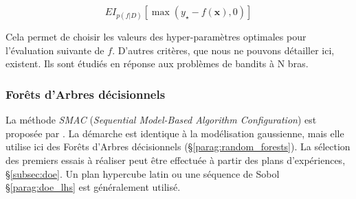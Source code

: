 \begin{equation} \label{eq:ei}
{EI}_{p(f | D)}\left[\max \left(y_{\star}-f(\boldsymbol{x}), 0\right)\right]
\end{equation}

Cela permet de choisir les valeurs des hyper-paramètres optimales pour l'évaluation suivante de $f$.
D'autres critères, que nous ne pouvons détailler ici, existent.
Ils sont étudiés en réponse aux problèmes de bandits à N bras.


\subsubsection{Forêts d'Arbres décisionnels} \label{subsubsec:rf_opt}
La méthode \textit{SMAC} (\textit{Sequential Model-Based Algorithm Configuration}) est proposée par \cite{hutter_sequential_2011}.
La démarche est identique à la modélisation gaussienne, mais elle utilise ici des Forêts d'Arbres décisionnels (§\ref{parag:random_forests}).
La sélection des premiers essais à réaliser peut être effectuée à partir des plans d'expériences, §\ref{subsec:doe}.
Un plan hypercube latin ou une séquence de Sobol §\ref{parag:doe_lhs} est généralement utilisé.

